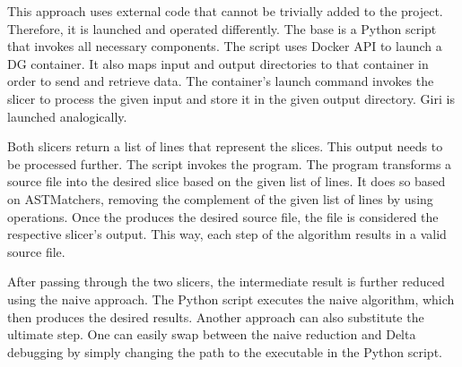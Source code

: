 This approach uses external code that cannot be trivially added to 
the project.
Therefore, it is launched and operated differently.
The base is a Python script that invokes all necessary components.
The script uses Docker API to launch a DG container.
It also maps input and output directories to that container in order to send 
and retrieve data.
The container's launch command invokes the slicer to process the given input 
and store it in the given output directory.
Giri is launched analogically.

Both slicers return a list of lines that represent the slices.
This output needs to be processed further.
The script invokes the  program.
The program transforms a source file into the desired slice based on 
the given list of lines.
It does so based on ASTMatchers, removing the complement of the given list 
of lines by using  operations.
Once the  produces the desired source file, the file 
is considered the respective slicer's output.
This way, each step of the algorithm results in a valid source file.

After passing through the two slicers, the intermediate result is further 
reduced using the naive approach.
The Python script executes the naive algorithm, which then produces the 
desired results.
Another approach can also substitute the ultimate step.
One can easily swap between the naive reduction and Delta debugging by 
simply changing the path to the executable in the Python script.
